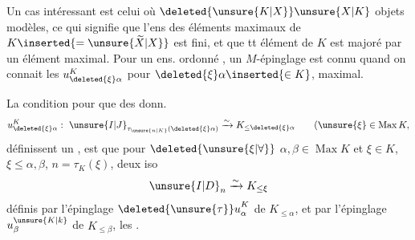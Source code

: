 Un cas intéressant est celui où $\deleted{\unsure{K|X}}\unsure{X|K}$  objets modèles, ce qui signifie que l'ens des éléments maximaux de $K\inserted{=\unsure{\widetilde X|X}}$ est fini, et que tt élément de $K$ est majoré par un élément maximal. Pour un ens. ordonné   , un $M$-épinglage est connu quand on connait les $u^K_{\deleted{\xi}\alpha}$ pour $\deleted{\xi}\alpha\inserted{\in K}$, maximal.

La condition pour que des donn.
\[
u^K_{\deleted{\xi}\alpha}:\ {\unsure{I|J}}_{\tau_{\unsure{n|K}}(\deleted{\xi}\alpha)}
   \xrightarrow{\sim} K_{\leq\deleted{\xi}\alpha}\qquad
   (\unsure{\xi}\in\operatorname{Max}K,
\]
définissent un , est que pour $\deleted{\unsure{\xi|\forall}}$ $\alpha,\beta\in\operatorname{Max}K$ et $\xi\in K$, $\xi\leq\alpha,\beta$,  $n=\tau_K(\xi)$,  deux iso
\[
{\unsure{I|D}}_n\xrightarrow{\sim}K_{\leq\xi}
\]
définis par l'épinglage  $ {\deleted{\unsure{\tau}}u}^K_\alpha$ de $K_{\leq\alpha}$, et par l'épinglage $u^{\unsure{K|k}}_\beta$ de $K_{\leq\beta}$,  les .
